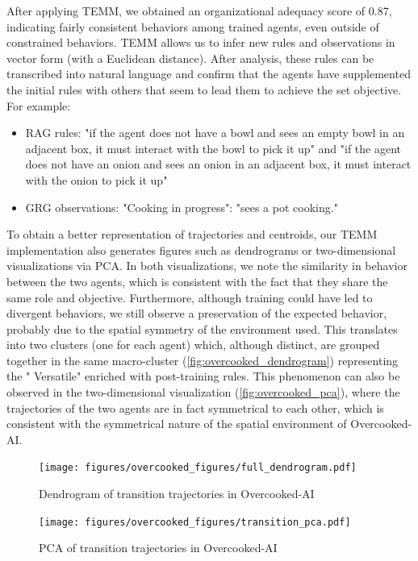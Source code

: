 After applying TEMM, we obtained an organizational adequacy score of 0.87, indicating fairly consistent behaviors among trained agents, even outside of constrained behaviors. TEMM allows us to infer new rules and observations in vector form (with a Euclidean distance). After analysis, these rules can be transcribed into natural language and confirm that the agents have supplemented the initial rules with others that seem to lead them to achieve the set objective. For example:
%
\begin{itemize}
  \item RAG rules: "if the agent does not have a bowl and sees an empty bowl in an adjacent box, it must interact with the bowl to pick it up" and "if the agent does not have an onion and sees an onion in an adjacent box, it must interact with the onion to pick it up"
  \item GRG observations: "Cooking in progress": "sees a pot cooking."
\end{itemize}

To obtain a better representation of trajectories and centroids, our TEMM implementation also generates figures such as dendrograms or two-dimensional visualizations via PCA. In both visualizations, we note the similarity in behavior between the two agents, which is consistent with the fact that they share the same role and objective. Furthermore, although training could have led to divergent behaviors, we still observe a preservation of the expected behavior, probably due to the spatial symmetry of the environment used. This translates into two clusters (one for each agent) which, although distinct, are grouped together in the same macro-cluster (\autoref{fig:overcooked_dendrogram}) representing the " Versatile" enriched with post-training rules. This phenomenon can also be observed in the two-dimensional visualization (\autoref{fig:overcooked_pca}), where the trajectories of the two agents are in fact symmetrical to each other, which is consistent with the symmetrical nature of the spatial environment of Overcooked-AI.

\begin{figure}[h!]
  \centering
  \texttt{[image: figures/overcooked\_figures/full\_dendrogram.pdf]}
  \caption{Dendrogram of transition trajectories in Overcooked-AI}
  \label{fig:overcooked_dendrogram}
\end{figure}

\begin{figure}[h!]
  \centering
  \texttt{[image: figures/overcooked\_figures/transition\_pca.pdf]}
  \caption{PCA of transition trajectories in Overcooked-AI}
  \label{fig:overcooked_pca}
\end{figure}

